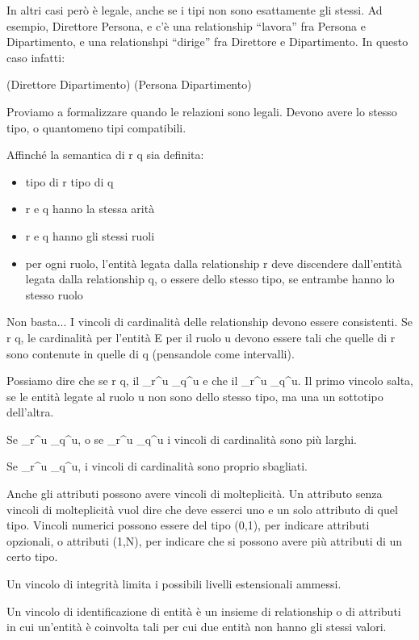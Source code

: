 In altri casi per\`o \`e legale, anche se i tipi non sono esattamente gli stessi. Ad esempio, Direttore \isa Persona, e c'\`e una relationship ``lavora'' fra Persona e Dipartimento, e una relationshpi ``dirige'' fra Direttore e Dipartimento. In questo caso infatti:

(Direttore \times Dipartimento) \subseteq (Persona \times Dipartimento)

Proviamo a formalizzare quando le relazioni \isa sono legali. Devono avere lo stesso tipo, o quantomeno tipi compatibili.

Affinch\'e la semantica di r \isa q sia definita:
\begin{itemize}
    \item tipo di r \subseteq tipo di q
    \item r e q hanno la stessa arit\`a
    \item r e q hanno gli stessi ruoli
    \item per ogni ruolo, l'entit\`a legata dalla relationship r deve discendere dall'entit\`a legata dalla relationship q, o essere dello stesso tipo, se entrambe hanno lo stesso ruolo
\end{itemize}
Non basta... I vincoli di cardinalit\`a delle relationship devono essere consistenti. Se r \isa q, le cardinalit\`a per l'entit\`a E per il ruolo u devono essere tali che quelle di r sono contenute in quelle di q (pensandole come intervalli).

Possiamo dire che se r \isa q, il \min_{r}^{u} \le \min_q^{u} e che il \max_r^{u} \le \max_q^{u}. Il primo vincolo salta, se le entit\`a legate al ruolo u non sono dello stesso tipo, ma una un sottotipo dell'altra.

Se \max_r^u \ge \max_q^u, o se \min_r^u \ge \max_q^u i vincoli di cardinalit\`a sono pi\`u larghi.

Se \min_r^u \ge \max_q^u, i vincoli di cardinalit\`a sono proprio sbagliati.

Anche gli attributi possono avere vincoli di molteplicit\`a. Un attributo senza vincoli di molteplicit\`a vuol dire che deve esserci uno e un solo attributo di quel tipo. Vincoli numerici possono essere del tipo (0,1), per indicare attributi opzionali, o attributi (1,N), per indicare che si possono avere pi\`u attributi di un certo tipo.

Un vincolo di integrit\`a limita i possibili livelli estensionali ammessi.

Un vincolo di identificazione di entit\`a \`e un insieme di relationship o di attributi in cui un'entit\`a \`e coinvolta tali per cui due entit\`a non hanno gli stessi valori.

